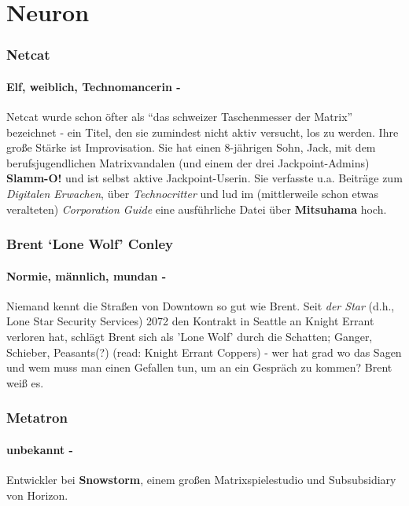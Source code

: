  
\section{Neuron}

    \subsubsection{Netcat}
    \paragraph{Elf, weiblich, Technomancerin -}%
    Netcat wurde schon öfter als ``das schweizer Taschenmesser der Matrix'' bezeichnet - ein Titel, den sie zumindest nicht aktiv versucht, los zu werden. Ihre große Stärke ist Improvisation. Sie hat einen 8-jährigen Sohn, Jack, mit dem berufsjugendlichen Matrixvandalen (und einem der drei Jackpoint-Admins) \textbf{Slamm-O!} und ist selbst aktive Jackpoint-Userin. Sie verfasste u.a. Beiträge zum \textit{Digitalen Erwachen}, über \textit{Technocritter} und lud im (mittlerweile schon etwas veralteten) \textit{Corporation Guide} eine ausführliche Datei über \textbf{Mitsuhama} hoch.
    
    \subsubsection{Brent ‘Lone Wolf’ Conley}
    \paragraph{Normie, männlich, mundan -} Niemand kennt die Straßen von Downtown so gut wie Brent. Seit \textit{der Star} (d.h., Lone Star Security Services) 2072 den Kontrakt in Seattle an Knight Errant verloren hat, schlägt Brent sich als 'Lone Wolf' durch die Schatten; Ganger, Schieber, Peasants(?) (read: Knight Errant Coppers) - wer hat grad wo das Sagen und wem muss man einen Gefallen tun, um an ein Gespräch zu kommen? Brent weiß es.
    
    \subsubsection{Metatron}
    \paragraph{unbekannt -} Entwickler bei \textbf{Snowstorm}, einem großen Matrixspielestudio und Subsubsidiary von Horizon.


